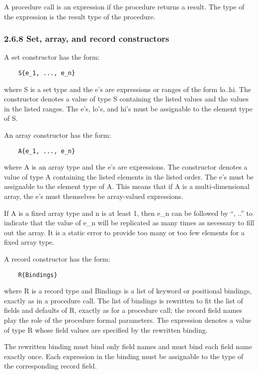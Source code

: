 \documentclass[10pt]{article}
\begin{document}
  A procedure call is an expression if the procedure returns a result. The type of the expression is the result type of the procedure. 


 
\subsubsection*{2.6.8 Set, array, and record constructors}


  A set constructor has the form: 
\begin{verbatim}
    S{e_1, ..., e_n}
\end{verbatim}
 where S is a set type and the e's are expressions or ranges of the form lo..hi. The constructor denotes a value of type S containing the listed values and the values in the listed ranges. The e's, lo's, and hi's must be assignable to the element type of S. 


 An array constructor has the form: 
\begin{verbatim}
    A{e_1, ..., e_n}
\end{verbatim}
 where A is an array type and the e's are expressions. The constructor denotes a value of type A containing the listed elements in the listed order. The e's must be assignable to the element type of A. This means that if A is a multi-dimensional array, the e's must themselves be array-valued expressions. 


  If A is a fixed array type and n is at least 1, then e\_n can be followed by ``, ..'' to indicate that the value of e\_n will be replicated as many times as necessary to fill out the array. It is a static error to provide too many or too few elements for a fixed array type. 


 A record constructor has the form: 
\begin{verbatim}
    R{Bindings}
\end{verbatim}
 where R is a record type and Bindings is a list of keyword or positional bindings, exactly as in a procedure call. The list of bindings is rewritten to fit the list of fields and defaults of R, exactly as for a procedure call; the record field names play the role of the procedure formal parameters. The expression denotes a value of type R whose field values are specified by the rewritten binding. 


  The rewritten binding must bind only field names and must bind each field name exactly once. Each expression in the binding must be assignable to the type of the corresponding record field. 
\end{document}
